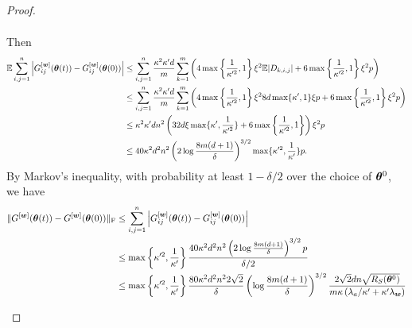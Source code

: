 \documentclass[twoside,11pt]{article}
\begin{document}
\begin{proof}
\begin{enumerate}[(a)]
\begin{enumerate}[(i)]
\begin{equation*}
\begin{aligned}
                            \end{aligned}
                        \end{equation*}
                        Then
                        \begin{equation*}
                            \begin{aligned}
                                \mathbb{E}\sum_{i,j=1}^n\left\lvert G_{ij}^{[\bm{w}]}(\bm{\theta}(t))-G_{ij}^{[\bm{w}]}(\bm{\theta}(0))\right\rvert
                                 & \leq\sum_{i,j=1}^n\frac{\kappa^2\kappa' d}{m}\sum_{k=1}^m\left(4\max\left\{\frac{1}{\kappa'^2},1\right\}\xi^2\mathbb{E}|D_{k,i,j}|+6\max\left\{\frac{1}{\kappa'^2},1\right\}\xi^2 p\right)           \\
                                 & \leq\sum_{i,j=1}^n\frac{\kappa^2\kappa' d}{m}\sum_{k=1}^m\left(4\max\left\{\frac{1}{\kappa'^2},1\right\}\xi^2 8d\max\{\kappa',1\}\xi p+6\max\left\{\frac{1}{\kappa'^2},1\right\}\xi^2 p\right) \\
                                 & \leq \kappa^2\kappa' d n^2\left(32d\xi\max\{\kappa',\frac{1}{\kappa'^2} \}   +6\max\left\{\frac{1}{\kappa'^2},1\right\}\right)\xi^2 p                                                          \\
                                 & \leq 40\kappa^2 d^2n^2\left(2\log\frac{8m(d+1)}{\delta}\right)^{3/2}\max\{\kappa'^2,\frac{1}{\kappa'}\} p.
                            \end{aligned}
                        \end{equation*}
                        By Markov's inequality, with probability at least $1-\delta/2$ over the choice of $\bm{\theta}^0$, we have
                        \begin{equation*}
                            \begin{aligned}
                                \norm{G^{[\vw]}(\vtheta(t))-G^{[\vw]}(\vtheta(0))}_\mathrm{F}
                                 & \leq \sum_{i,j=1}^n\Big|G_{ij}^{[\vw]}(\vtheta(t))-G^{[\vw]}_{ij}(\vtheta(0))\Big|                                                                                                                                                 \\
                                 & \leq \max\left\{\kappa'^2,\frac{1}{\kappa'}\right\}\frac{40\kappa^2 d^2n^2\left(2\log\frac{8m(d+1)}{\delta}\right)^{3/2} p}{\delta/2}                                                                                                         \\
                                 & \leq \max\left\{\kappa'^2,\frac{1}{\kappa'}\right\}\frac{80\kappa^2 d^2n^2 2\sqrt{2}}{\delta}\left(\log\frac{8m(d+1)}{\delta}\right)^{3/2}\frac{2\sqrt{2}dn\sqrt{\RS(\vtheta^0)}}{m\kappa\left(\lambda_a/\kappa'+\kappa'\lambda_{\vw}\right)} \\

\end{aligned}
\end{equation*}
\end{enumerate}
\end{enumerate}
\end{proof}
\end{document}
